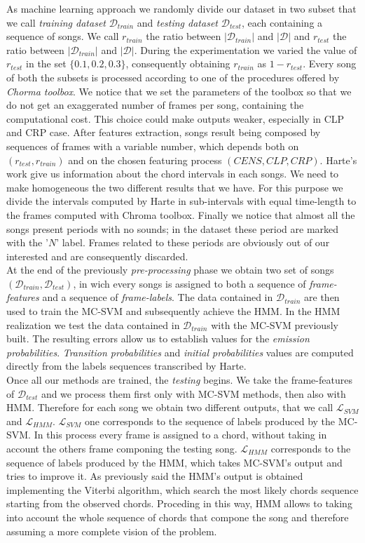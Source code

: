 As machine learning approach we randomly divide our dataset in two subset that we call \textit{training dataset} $\mathcal{D}_{train}$ and \textit{testing dataset}  $\mathcal{D}_{test}$, each containing a sequence of songs. We call $r_{train}$ the ratio between $|\mathcal{D}_{train}|$ and $|\mathcal{D}|$ and $r_{test}$ the ratio between $|\mathcal{D}_{train}|$ and $|\mathcal{D}|$. During the experimentation we varied the value of $r_{test}$ in the set $\{0.1,0.2,0.3\}$, consequently obtaining $r_{train}$ as $1-r_{test}$. Every song of both the subsets is processed according to one of the procedures offered by \textit{Chorma toolbox}. We notice that we set the parameters of the toolbox so that we do not get an exaggerated number of frames per song, containing the computational cost. This choice could make outputs weaker, especially in CLP and CRP case. After features extraction, songs result being composed by sequences of frames with a variable number, which depends both on $(r_{test},r_{train})$ and on the chosen featuring process $(CENS,CLP,CRP)$. Harte's work give us information about the chord intervals in each songs. We need to make homogeneous the two different results that we have. For this purpose we divide the intervals computed by Harte in sub-intervals with equal time-length to the frames computed with Chroma toolbox. Finally we notice that almost all the songs present periods with no sounds; in the dataset these period are marked with the '$N$' label. Frames related to these periods are obviously out of our interested and are consequently discarded. \\
%
At the end of the previously \textit{pre-processing} phase we obtain two set of songs $(\mathcal{D}_{train},\mathcal{D}_{test})$, in wich every songs is assigned to both a sequence of \textit{frame-features} and a sequence of \textit{frame-labels}. The data contained in $\mathcal{D}_{train}$ are then used to train the MC-SVM and subsequently achieve the HMM. In the HMM realization we test the data contained in $\mathcal{D}_{train}$ with the MC-SVM previously built. The resulting errors allow us to establish values for the \textit{emission probabilities}. \textit{Transition probabilities} and \textit{initial probabilities} values are computed directly from the labels sequences transcribed by Harte. \\
%
Once all our methods are trained, the \textit{testing} begins. We take the frame-features of $\mathcal{D}_{test}$ and we process them first only with MC-SVM methods, then also with HMM. Therefore for each song we obtain two different outputs, that we call $\mathcal{L}_{SVM}$ and $\mathcal{L}_{HMM}$. $\mathcal{L}_{SVM}$ one corresponds to the sequence of labels produced by the MC-SVM. In this process every frame is assigned to a chord, without taking in account the others frame componing the testing song. $\mathcal{L}_{HMM}$ corresponds to the sequence of labels produced by the HMM, which takes MC-SVM's output and tries to improve it. As previously said the HMM's output is obtained implementing the Viterbi algorithm, which search the most likely chords sequence starting from the observed chords. Proceding in this way, HMM allows to taking into account the whole sequence of chords that compone the song and therefore assuming a more complete vision of the problem. 
